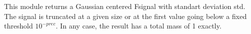 This module returns a Gaussian centered Fsignal
with standart deviation std. The signal is truncated
at a given size or at the first value going below
a fixed threshold $10^{-prec}$. In any case, the result  
has a total mass of 1 exactly.